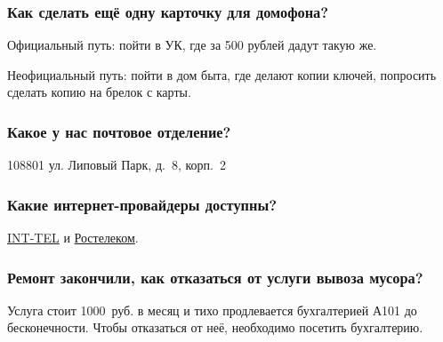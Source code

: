 \documentclass[10pt,landscape,a4paper]{article}
\begin{document}
\begin{multicols*}{3}
  \subsubsection*{Как сделать ещё одну карточку для домофона?}
  Официальный путь: пойти в УК, где за 500 рублей дадут такую же.

  Неофициальный путь: пойти в дом быта, где делают копии ключей, попросить сделать копию на брелок с карты.

  \subsubsection*{Какое у нас почтовое отделение?}

  108801 ул. Липовый Парк, д.~8, корп.~2

  \subsubsection*{Какие интернет-провайдеры доступны?}

  \href{http://int-tel.net/}{INT-TEL} и \href{https://moscow.rt.ru/}{Ростелеком}.

  \subsubsection*{Ремонт закончили, как отказаться от услуги вывоза мусора?}

  Услуга стоит 1000~руб. в месяц и тихо продлевается бухгалтерией А101 до бесконечности. Чтобы отказаться от неё, необходимо посетить
  бухгалтерию.

\end{multicols*}
\end{document}

